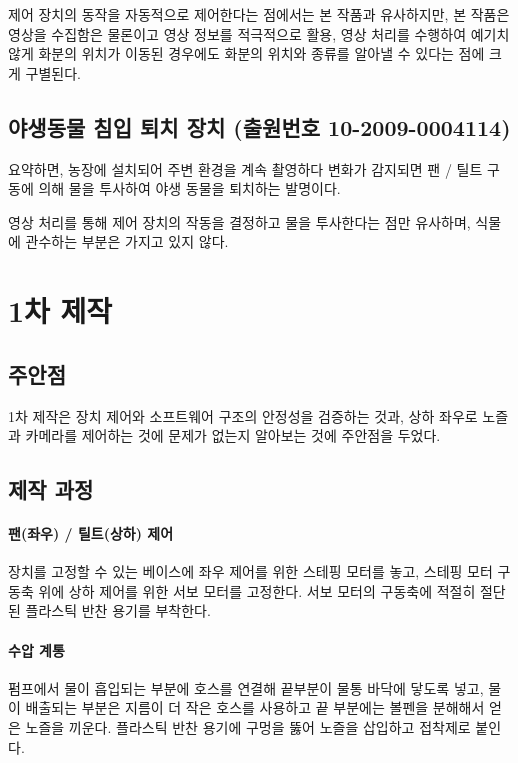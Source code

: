 \documentclass[chapter,11pt,oneside,openany]{xoblivoir}
\begin{document}
제어 장치의 동작을 자동적으로 제어한다는 점에서는 본 작품과 유사하지만,
본 작품은 영상을 수집함은 물론이고 영상 정보를 적극적으로 활용, 영상 처리를 수행하여 예기치 않게 화분의 위치가
이동된 경우에도 화분의 위치와 종류를 알아낼 수 있다는 점에 크게 구별된다.

\subsection[야생동물 침입 퇴치 장치]{야생동물 침입 퇴치 장치 (출원번호 10-2009-0004114)}
요약하면, 농장에 설치되어 주변 환경을 계속 촬영하다 변화가 감지되면 팬 / 틸트 구동에 의해 물을 투사하여
야생 동물을 퇴치하는 발명이다.

영상 처리를 통해 제어 장치의 작동을 결정하고 물을 투사한다는 점만 유사하며, 식물에 관수하는 부분은 가지고 있지 않다.

\section{1차 제작}

\subsection{주안점}
1차 제작은 장치 제어와 소프트웨어 구조의 안정성을 검증하는 것과,
상하 좌우로 노즐과 카메라를 제어하는 것에 문제가 없는지 알아보는 것에 주안점을 두었다.

\subsection{제작 과정}

\paragraph{팬(좌우) / 틸트(상하) 제어}
장치를 고정할 수 있는 베이스에 좌우 제어를 위한 스테핑 모터를 놓고, 스테핑 모터 구동축 위에
상하 제어를 위한 서보 모터를 고정한다. 서보 모터의 구동축에 적절히 절단된 플라스틱 반찬 용기를 부착한다.

\paragraph{수압 계통}
펌프에서 물이 흡입되는 부분에 호스를 연결해 끝부분이 물통 바닥에 닿도록 넣고,
물이 배출되는 부분은 지름이 더 작은 호스를 사용하고 끝 부분에는 볼펜을 분해해서 얻은 노즐을 끼운다.
플라스틱 반찬 용기에 구멍을 뚫어 노즐을 삽입하고 접착제로 붙인다.
\end{document}
